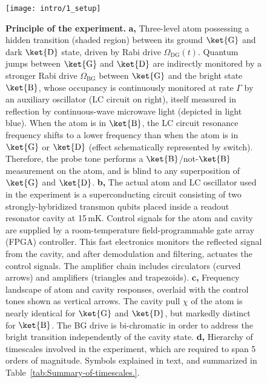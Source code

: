 \begin{figure}
\centering{}\texttt{[image: intro/1\_setup]} \caption[Principle of the experiment]{\label{fig:setup}\textbf{Principle of the experiment.} \textbf{a,}
Three-level atom possessing a hidden transition (shaded region) between
its ground $\ket{\mathrm{G}}$ and dark $\ket{\mathrm{D}}$ state,
driven by Rabi drive $\Omega_{\mathrm{DG}}(t)$. Quantum jumps between
$\ket{\mathrm{G}}$ and $\ket{\mathrm{D}}$ are indirectly monitored
by a stronger Rabi drive $\Omega_{\mathrm{BG}}$ between $\ket{\mathrm{G}}$
and the bright state $\ket{\mathrm{B}}$, whose occupancy is continuously
monitored at rate $\Gamma$ by an auxiliary oscillator (LC circuit
on right), itself measured in reflection by continuous-wave microwave
light (depicted in light blue). When the atom is in $\ket{\mathrm{B}}$,
the LC circuit resonance frequency shifts to a lower frequency than
when the atom is in $\ket{\mathrm{G}}$ or $\ket{\mathrm{D}}$ (effect
schematically represented by switch). Therefore, the probe tone performs
a $\ket{\mathrm{B}}$/not-$\ket{\mathrm{B}}$ measurement on the atom,
and is blind to any superposition of $\ket{\mathrm{G}}$ and $\ket{\mathrm{D}}$.
\textbf{b,} The actual atom and LC oscillator used in the experiment
is a superconducting circuit consisting of two strongly-hybridized
transmon qubits placed inside a readout resonator cavity at 15\,mK.
Control signals for the atom and cavity are supplied by a room-temperature
field-programmable gate array (FPGA) controller. This fast electronics
monitors the reflected signal from the cavity, and after demodulation
and filtering, actuates the control signals. The amplifier chain includes
circulators (curved arrows) and amplifiers (triangles and trapezoids).
\textbf{c,} Frequency landscape of atom and cavity responses, overlaid
with the control tones shown as vertical arrows. The cavity pull $\chi$
of the atom is nearly identical for $\ket{\mathrm{G}}$ and $\ket{\mathrm{D}}$,
but markedly distinct for $\ket{\mathrm{B}}$. The BG drive is bi-chromatic
in order to address the bright transition independently of the cavity
state. \textbf{d,} Hierarchy of timescales involved in the experiment,
which are required to span 5 orders of magnitude. Symbols explained
in text, and summarized in Table~\ref{tab:Summary-of-timescales.}.}
\end{figure}


